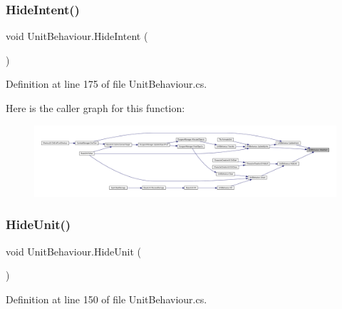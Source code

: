 \subsubsection{\texorpdfstring{HideIntent()}{HideIntent()}}
{\footnotesize\ttfamily void Unit\+Behaviour.\+Hide\+Intent (\begin{DoxyParamCaption}{ }\end{DoxyParamCaption})}



Definition at line 175 of file Unit\+Behaviour.\+cs.

Here is the caller graph for this function\+:
\nopagebreak
\begin{figure}[H]
\begin{center}
\leavevmode
\includegraphics[width=350pt]{class_unit_behaviour_a9ba9de594c111333c048b477dd295025_icgraph}
\end{center}
\end{figure}
\mbox{\label{class_unit_behaviour_aaf48af005978a326a61c98905630e469}} 
\subsubsection{\texorpdfstring{HideUnit()}{HideUnit()}}
{\footnotesize\ttfamily void Unit\+Behaviour.\+Hide\+Unit (\begin{DoxyParamCaption}{ }\end{DoxyParamCaption})}



Definition at line 150 of file Unit\+Behaviour.\+cs.

